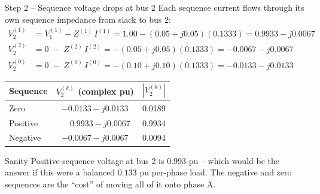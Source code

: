 \documentclass[aspectratio=169,10pt]{beamer}
\begin{document}
\begin{frame}{Step 2 -- Sequence voltage drops at bus 2}
Each sequence current flows through its own sequence impedance from slack to bus 2:
\begin{align*}
V^{(1)}_2 &= V^{(1)}_1 - Z^{(1)} \, I^{(1)} = 1.00 - (0.05 + j0.05)(0.1333) = 0.9933 - j0.0067 \\
V^{(2)}_2 &= 0 \;-\; Z^{(2)} \, I^{(2)} = -(0.05 + j0.05)(0.1333) = -0.0067 - j0.0067 \\
V^{(0)}_2 &= 0 \;-\; Z^{(0)} \, I^{(0)} = -(0.10 + j0.10)(0.1333) = -0.0133 - j0.0133
\end{align*}
\vspace{0.3em}
\centering
\small
\begin{tabular}{lcc}
\toprule
Sequence & $V^{(k)}_2$ (complex pu) & $|V^{(k)}_2|$ \\
\midrule
Zero & $-0.0133 - j0.0133$ & 0.0189 \\
Positive & $\phantom{-}0.9933 - j0.0067$ & 0.9934 \\
Negative & $-0.0067 - j0.0067$ & 0.0094 \\
\bottomrule
\end{tabular}
\vspace{0.4em}
\begin{alertblock}{Sanity}
Positive-sequence voltage at bus 2 is $0.993$ pu -- which would be the answer if this were a balanced $0.133$ pu per-phase load. The negative and zero sequences are the ``cost'' of moving all of it onto phase A.
\end{alertblock}
\end{frame}
\end{document}
